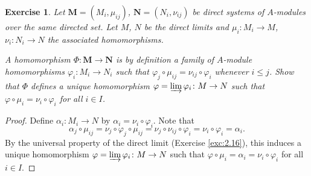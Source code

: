 \documentclass[12pt,letterpaper]{article}
\newtheorem{problem}{Exercise}[section]
\theoremstyle{definition}
\theoremstyle{remark}
\numberwithin{figure}{problem}
\numberwithin{equation}{section}
\begin{document}
\begin{problem}
  Let $\mathbf{M} = (M_i,\mu_{ij})$, $\mathbf{N} = (N_i,\nu_{ij})$ be direct
  systems of $A$-modules over the same directed set.
  Let $M$, $N$ be the direct limits and $\mu_i \colon M_i \to M$, $\nu_i \colon
  N_i \to N$ the associated homomorphisms.
  \par A \emph{homomorphism} $\Phi \colon \mathbf{M} \to \mathbf{N}$ is by
  definition a family of $A$-module homomorphisms $\varphi_i \colon M_i \to
  N_i$ such that $\varphi_j \circ \mu_{ij} = \nu_{ij} \circ \varphi_i$ whenever
  $i \le j$. Show that $\Phi$ defines a unique homomorphism
  $\varphi = \varinjlim\varphi_i\colon M \to N$ such that $\varphi \circ
  \mu_i = \nu_i \circ \varphi_i$ for all $i \in I$.
\end{problem}
\begin{proof}
  Define $\alpha_i \colon M_i \to N$ by $\alpha_i = \nu_i \circ \varphi_i$.
  Note that
  \begin{equation*}
    \alpha_j \circ \mu_{ij} = \nu_j \circ \varphi_j \circ \mu_{ij}
    = \nu_j \circ \nu_{ij} \circ \varphi_i = \nu_i \circ \varphi_i = \alpha_i.
  \end{equation*}
  By the universal property of the direct limit (Exercise \ref{exc:2.16}),
  this induces a unique homomorphism $\varphi = \varinjlim \varphi_i \colon
  M \to N$ such that $\varphi \circ \mu_i = \alpha_i = \nu_i \circ \varphi_i$
  for all $i \in I$.
\end{proof}
\end{document}

